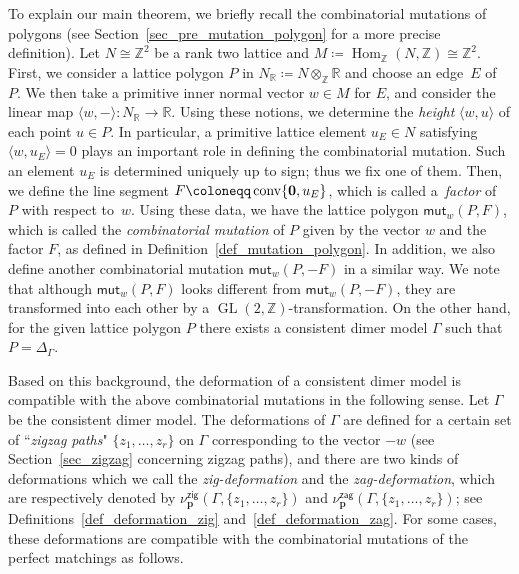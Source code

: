 \documentclass[pdftex]{sigma}%
\numberwithin{equation}{section}
\numberwithin{figure}{section}
\numberwithin{table}{section}
\newcommand{\ZZ}{\mathbb{Z}}
\newcommand{\RR}{\mathbb{R}}
\newcommand{\bfp}{\mathbf{p}}
\newcommand{\Hom}{\operatorname{Hom}}
\newcommand{\GL}{\operatorname{GL}}
\newcommand{\zig}{\mathsf{zig}}
\newcommand{\zag}{\mathsf{zag}}
\newcommand{\mut}{\mathsf{mut}}
\begin{document}
To explain our main theorem, we briefly recall the combinatorial mutations of polygons (see Section~\ref{sec_pre_mutation_polygon} for a more precise definition).
Let $N\cong\ZZ^2$ be a rank two lattice and $M\coloneqq\Hom_\ZZ(N,\ZZ)\cong\ZZ^2$.
First, we consider a lattice polygon $P$ in $N_\RR\coloneqq N\otimes_\ZZ \RR$ and choose an edge~$E$ of~$P$.
We then take a primitive inner normal vector $w\in M$ for $E$, and consider the linear map $\langle w,-\rangle\colon N_\RR\rightarrow \RR$.
Using these notions, we determine the \emph{height} $\langle w,u\rangle$ of each point $u\in P$.
In particular, a primitive lattice element $u_E\in N$ satisfying $\langle w,u_E\rangle=0$ plays an important role in defining the combinatorial mutation.
Such an element $u_E$ is determined uniquely up to sign; thus we fix one of them.
Then, we define the line segment $F\coloneqq\operatorname{conv}\{{\bf 0},u_E\}$, which is called a~\emph{factor} of~$P$ with respect to~$w$.
Using these data, we have the lattice polygon $\mut_w(P,F)$, which is called the \emph{combinatorial mutation} of $P$ given by the vector $w$ and the factor $F$, as defined in Definition~\ref{def_mutation_polygon}.
In addition, we also define another combinatorial mutation $\mut_w(P,-F)$ in a similar way.
We note that although $\mut_w(P,F)$ looks different from $\mut_w(P,-F)$, they are transformed into each other by a $\GL(2,\ZZ)$-transformation.
On the other hand, for the given lattice polygon $P$ there exists a consistent dimer model $\Gamma$ such that $P=\Delta_\Gamma$.

Based on this background, the deformation of a consistent dimer model is compatible with the above combinatorial mutations in the following sense.
Let $\Gamma$ be the consistent dimer model.
The deformations of $\Gamma$ are defined for a certain set of ``\emph{zigzag paths}" $\{z_1,\dots,z_r\}$ on $\Gamma$ corresponding to the vector $-w$ (see Section~\ref{sec_zigzag} concerning zigzag paths),
and there are two kinds of deformations which we call the \emph{zig-deformation} and the \emph{zag-deformation},
which are respectively denoted by $\nu_\bfp^\zig(\Gamma,\{z_1,\dots,z_r\})$ and $\nu_\bfp^\zag(\Gamma,\{z_1,\dots,z_r\})$; see Definitions~\ref{def_deformation_zig} and~\ref{def_deformation_zag}.
For some cases, these deformations are compatible with the combinatorial mutations of the perfect matchings as follows.
\end{document}
